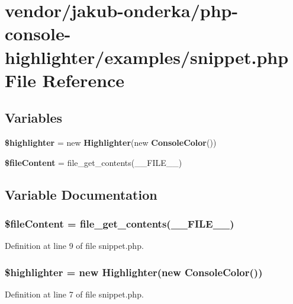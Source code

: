 \section{vendor/jakub-\/onderka/php-\/console-\/highlighter/examples/snippet.php File Reference}
\label{snippet_8php}
\subsection*{Variables}
\begin{DoxyCompactItemize}
\item 
{\bf \$highlighter} = new {\bf Highlighter}(new {\bf Console\+Color}())
\item 
{\bf \$file\+Content} = file\+\_\+get\+\_\+contents(\+\_\+\+\_\+\+F\+I\+L\+E\+\_\+\+\_\+)
\end{DoxyCompactItemize}


\subsection{Variable Documentation}
\subsubsection[{\$file\+Content}]{\setlength{\rightskip}{0pt plus 5cm}\$file\+Content = file\+\_\+get\+\_\+contents(\+\_\+\+\_\+\+F\+I\+L\+E\+\_\+\+\_\+)}\label{snippet_8php_ad89080bb6e501b4f254f01ee5d24fa2d}


Definition at line 9 of file snippet.\+php.

\subsubsection[{\$highlighter}]{\setlength{\rightskip}{0pt plus 5cm}\$highlighter = new {\bf Highlighter}(new {\bf Console\+Color}())}\label{snippet_8php_a19caa67352dbd1540a123648430ea09b}


Definition at line 7 of file snippet.\+php.

